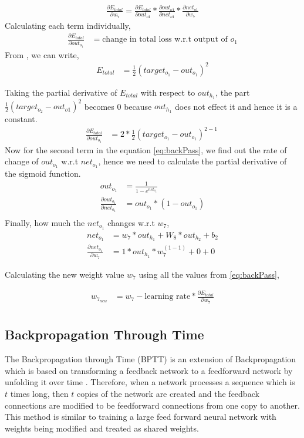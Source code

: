 \begin{align}
    \frac{\partial E_{total}}{\partial w_{7}} = \frac{\partial E_{total}}{\partial out_{o1}} * \frac{\partial out_{o1}}{\partial net_{o1}} * \frac{\partial net_{o1}}{\partial w_{7}} \label{eq:backPass}
\end{align}
Calculating each term individually,
\begin{align}
    \frac{\partial E_{total} }{\partial out_{o_{1}}} &= \text{change in total loss w.r.t output of $o_{1}$}
\end{align}
From , we can write,
\begin{align}
    E_{total} &= \frac{1}{2}(target_{o_{1}} - out_{o_{1}})^{2}
\end{align}

Taking the partial derivative of $E_{total}$ with respect to $out_{h_{1}}$, the part $\frac{1}{2}(target_{o_{2}} - out_{o{1}})^{2}$ becomes 0 because $out_{h_{1}}$ does not effect it and hence it is a constant.
\begin{align}
    \frac{\partial E_{total}}{\partial out_{o_{1}}} &= 2 * \frac{1}{2}(target_{o_{1}} - out_{o_{1}})^{2 - 1} \
\end{align}
Now for the second term in the equation \ref{eq:backPass}, we find out the rate of change of $out_{o_{1}}$ w.r.t $net_{o_{1}}$, hence we need to calculate the partial derivative of the sigmoid function. 
\begin{align}
    out_{o_{1}} &= \frac{1}{1-e^{net_{o_{1}}}}\\
    \frac{\partial out_{o_{1}}}{\partial net_{o_{1}}} &=  out_{o_{1}}*(1-out_{o_{1}}) \\
\end{align}
Finally, how much the $net_{o_{1}}$ changes w.r.t $w_{7}$,
\begin{align}
    net_{o_{1}} &= w_{7} * out_{h_{1}} + W_{8} * out_{h_{2}} + b_{2}   \\
    \frac{\partial net_{o_{1}}}{\partial w_{7}} &=  1 * out_{h_{1}} * w_{7}^{(1 - 1)} + 0 + 0
\end{align}

Calculating the new weight value $w_{7}$ using all the values from \ref{eq:backPass}, 

\begin{align}
    w_{7_{new}} &= w_{7} -\text{learning rate} * \frac{\partial E_{total}}{\partial w_{7}} \\ 
\end{align}

\subsection{Backpropagation Through Time}
The Backpropagation through Time (BPTT) is an extension of Backpropagation which is based on transforming a feedback network to a feedforward network by unfolding it over time \cite{ahmad2004recurrent}. Therefore, when a network processes a sequence which is $t$ times long, then $t$ copies of the network are created and the feedback connections are modified to be feedforward connections from one copy to another. This method is similar to training a large feed forward neural network with weights being modified and treated as shared weights.

